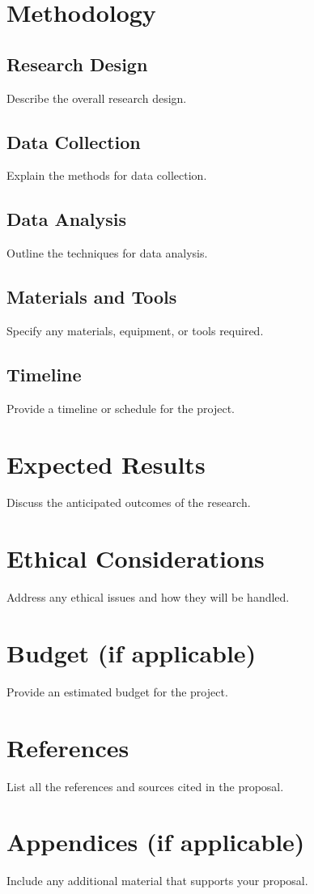 \documentclass[twocolumn]{article}
\begin{document}
\section{Methodology}
\subsection{Research Design}
Describe the overall research design.

\subsection{Data Collection}
Explain the methods for data collection.

\subsection{Data Analysis}
Outline the techniques for data analysis.

\subsection{Materials and Tools}
Specify any materials, equipment, or tools required.

\subsection{Timeline}
Provide a timeline or schedule for the project.

\section{Expected Results}
Discuss the anticipated outcomes of the research.

\section{Ethical Considerations}
Address any ethical issues and how they will be handled.

\section{Budget (if applicable)}
Provide an estimated budget for the project.

\section{References}
List all the references and sources cited in the proposal.

\section{Appendices (if applicable)}
Include any additional material that supports your proposal.
\end{document}
